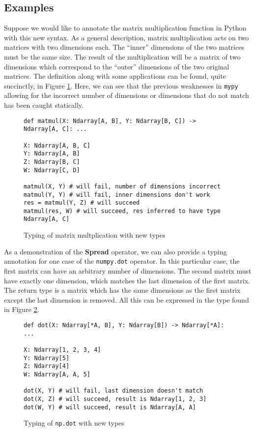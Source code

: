 \documentclass{report}
\begin{document}
\subsection{Examples}

Suppose we would like to annotate the matrix multiplication function in Python with this new syntax. As a general description, matrix multiplication acts on two matrices with two dimensions each. The ``inner'' dimensions of the two matrices must be the same size. The result of the multiplication will be a matrix of two dimensions which correspond to the ``outer'' dimensions of the two original matrices. The definition along with some applications can be found, quite succinctly, in Figure \ref{np-type-matmul}. Here, we can see that the previous weaknesses in \texttt{mypy} allowing for the incorrect number of dimensions or dimensions that do not match has been caught statically.

\begin{figure}
    \centering
    \begin{verbatim}
def matmul(X: Ndarray[A, B], Y: Ndarray[B, C]) -> Ndarray[A, C]: ...

X: Ndarray[A, B, C]
Y: Ndarray[A, B]
Z: Ndarray[B, C]
W: Ndarray[C, D]

matmul(X, Y) # will fail, number of dimensions incorrect
matmul(Y, Y) # will fail, inner dimensions don't work
res = matmul(Y, Z) # will succeed
matmul(res, W) # will succeed, res inferred to have type Ndarray[A, C]\end{verbatim}
    \caption{Typing of matrix multplication with new types}
    \label{np-type-matmul}
\end{figure}

As a demonstration of the \textbf{Spread} operator, we can also provide a typing annotation for one case of the \texttt{numpy.dot} operator. In this particular case, the first matrix can have an arbitrary number of dimensions. The second matrix must have exactly one dimension, which matches the last dimension of the first matrix. The return type is a matrix which has the same dimensions as the first matrix except the last dimension is removed. All this can be expressed in the type found in Figure \ref{np-type-dot}.

\begin{figure}
    \begin{verbatim}
def dot(X: Ndarray[*A, B], Y: Ndarray[B]) -> Ndarray[*A]: ...

X: Ndarray[1, 2, 3, 4]
Y: Ndarray[5]
Z: Ndarray[4]
W: Ndarray[A, A, 5]

dot(X, Y) # will fail, last dimension doesn't match
dot(X, Z) # will succeed, result is Ndarray[1, 2, 3]
dot(W, Y) # will succeed, result is Ndarray[A, A]\end{verbatim}
    \caption{Typing of \texttt{np.dot} with new types}
    \label{np-type-dot}
\end{figure}
\end{document}
